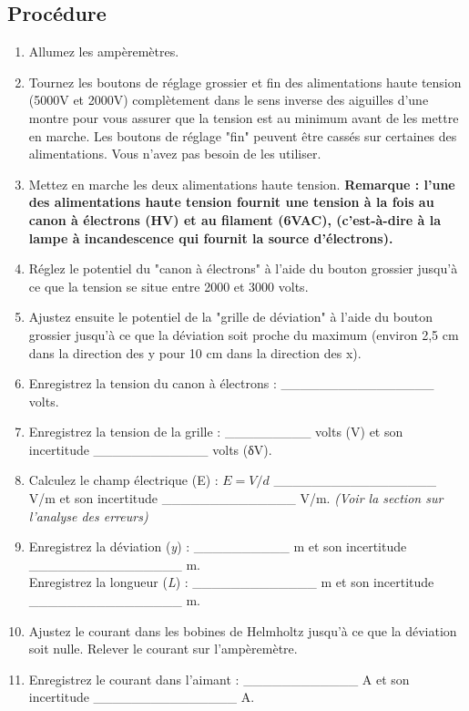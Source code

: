 \documentclass[../main.tex]{subfiles}
\begin{document}
\subsection{Procédure}
\begin{enumerate}
    \item Allumez les ampèremètres. 
    \item Tournez les boutons de réglage grossier et fin des alimentations haute tension (5000V et 2000V) complètement dans le sens inverse des aiguilles d'une montre pour vous assurer que la tension est au minimum avant de les mettre en marche.  Les boutons de réglage "fin" peuvent être cassés sur certaines des alimentations.  Vous n'avez pas besoin de les utiliser. 
    \item Mettez en marche les deux alimentations haute tension.  \textbf{Remarque : l'une des alimentations haute tension fournit une tension à la fois au canon à électrons (HV) et au filament (6VAC), (c'est-à-dire à la lampe à incandescence qui fournit la source d'électrons). }
    \item Réglez le potentiel du "canon à électrons" à l'aide du bouton grossier jusqu'à ce que la tension se situe entre 2000 et 3000 volts. 
    \item Ajustez ensuite le potentiel de la "grille de déviation" à l'aide du bouton grossier jusqu'à ce que la déviation soit proche du maximum (environ 2,5 cm dans la direction des y pour 10 cm dans la direction des x).  
    \item Enregistrez la tension du canon à électrons :     ________________ volts.  
    \item Enregistrez la tension de la grille :   _________ volts (V) et son incertitude ____________ volts (δV).  
    \item Calculez le champ électrique (E) :  $E=V/d$ _________________ V/m et son incertitude ______________ V/m.  \textit{(Voir la section sur l'analyse des erreurs)}
    \item Enregistrez la déviation (\textit{y}) :   __________ m et son incertitude ________________ m.\\ Enregistrez la longueur (\textit{L}) :   _____________ m et son incertitude ________________ m. 
    \item Ajustez le courant dans les bobines de Helmholtz jusqu'à ce que la déviation soit nulle.  Relever le courant sur l'ampèremètre.  
    \item Enregistrez le courant dans l'aimant :       ____________ A et son incertitude _______________ A. \\

\end{enumerate}
\end{document}
